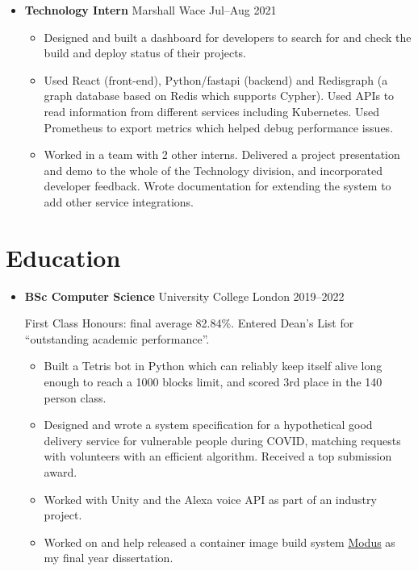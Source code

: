 \begin{itemize}
    \item \textbf{Technology Intern} \dashdiv{} Marshall Wace \dashdiv{} Jul--Aug 2021

    \begin{itemize}
      \item Designed and built a dashboard for developers to search for and check the build and deploy status of their projects.
      \item Used React (front-end), Python/fastapi (backend) and Redisgraph (a graph database based on Redis which supports Cypher). Used APIs to read information from different services including Kubernetes. Used Prometheus to export metrics which helped debug performance issues.
      \item Worked in a team with 2 other interns. Delivered a project presentation and demo to the whole of the Technology division, and incorporated developer feedback. Wrote documentation for extending the system to add other service integrations.
    \end{itemize}

  \end{itemize}

  \section{Education}

  \begin{itemize}
    \item \textbf{BSc Computer Science} \dashdiv{} University College London \dashdiv{} 2019--2022

      First Class Honours: final average 82.84\%. Entered Dean's List for ``outstanding academic performance''.

      \begin{itemize}
        \item Built a Tetris bot in Python which can reliably keep itself alive long enough to reach a 1000 blocks limit, and scored 3rd place in the 140 person class.

        \item Designed and wrote a system specification for a hypothetical good delivery service for vulnerable people during COVID, matching requests with volunteers with an efficient algorithm. Received a top submission award.

        \item Worked with Unity and the Alexa voice API as part of an industry project.

        \item Worked on and help released a container image build system \href{https://modus-continens.com/}{\color{link}Modus} as my final year dissertation.
      \end{itemize}


  \end{itemize}

